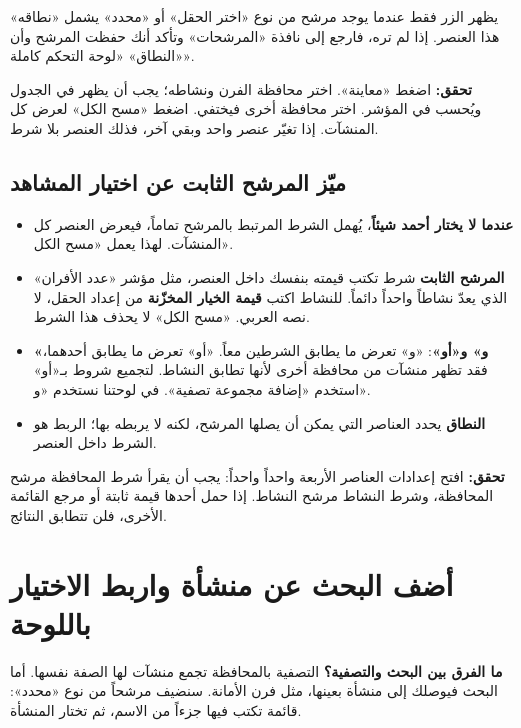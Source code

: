 \begin{rcnote}
يظهر الزر فقط عندما يوجد مرشح من نوع «اختر الحقل» أو «محدد» يشمل «نطاقه» هذا العنصر. إذا لم تره، فارجع إلى نافذة «المرشحات» وتأكد أنك حفظت المرشح وأن «النطاق» «لوحة التحكم كاملة».
\end{rcnote}

\textbf{تحقق:} اضغط «معاينة». اختر محافظة الفرن ونشاطه؛ يجب أن يظهر في الجدول ويُحسب في المؤشر. اختر محافظة أخرى فيختفي. اضغط «مسح الكل» لعرض كل المنشآت. إذا تغيّر عنصر واحد وبقي آخر، فذلك العنصر بلا شرط.

\subsection{ميّز المرشح الثابت عن اختيار المشاهد}

\begin{itemize}
\item \textbf{عندما لا يختار أحمد شيئاً}، يُهمل الشرط المرتبط بالمرشح تماماً، فيعرض العنصر كل المنشآت. لهذا يعمل «مسح الكل».
\item \textbf{المرشح الثابت} شرط تكتب قيمته بنفسك داخل العنصر، مثل مؤشر «عدد الأفران» الذي يعدّ نشاطاً واحداً دائماً. للنشاط اكتب \textbf{قيمة الخيار المخزّنة} من إعداد الحقل، لا نصه العربي. «مسح الكل» لا يحذف هذا الشرط.
\item \textbf{«و» و«أو»}: «و» تعرض ما يطابق الشرطين معاً. «أو» تعرض ما يطابق أحدهما، فقد تظهر منشآت من محافظة أخرى لأنها تطابق النشاط. لتجميع شروط بـ«أو» استخدم «إضافة مجموعة تصفية». في لوحتنا نستخدم «و».
\item \textbf{النطاق} يحدد العناصر التي يمكن أن يصلها المرشح، لكنه لا يربطه بها؛ الربط هو الشرط داخل العنصر.
\end{itemize}

\textbf{تحقق:} افتح إعدادات العناصر الأربعة واحداً واحداً: يجب أن يقرأ شرط المحافظة مرشح المحافظة، وشرط النشاط مرشح النشاط. إذا حمل أحدها قيمة ثابتة أو مرجع القائمة الأخرى، فلن تتطابق النتائج.

\section{أضف البحث عن منشأة واربط الاختيار باللوحة}
\label{sec:build-dashboard-search}

\textbf{ما الفرق بين البحث والتصفية؟} التصفية بالمحافظة تجمع منشآت لها الصفة نفسها. أما البحث فيوصلك إلى منشأة بعينها، مثل فرن الأمانة. سنضيف مرشحاً من نوع «محدد»: قائمة تكتب فيها جزءاً من الاسم، ثم تختار المنشأة.

